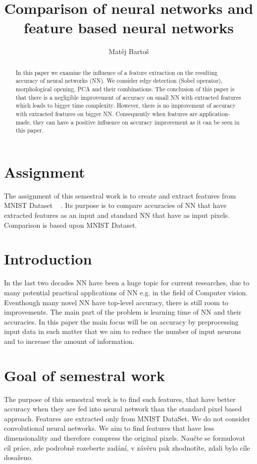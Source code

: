 \documentclass[journal]{IEEEtran}
\begin{document}
\title{Comparison of neural networks and feature based neural networks}
\author{Matěj Bartoš}

\maketitle

\begin{abstract}
In this paper we examine the influence of a feature extraction on the resulting accuracy of neural networks (NN).
We consider edge detection (Sobel operator), morphological opening, PCA and their combinations.
The conclusion of this paper is that there is a negligible improvement of accuracy on small NN with extracted features which leads to bigger time complexity. However, there is no improvement of accuracy with extracted features on bigger NN. Consequently when features are application-made, they can have a positive influence on accuracy improvement as it can be seen in this paper.
\end{abstract}

\IEEEpeerreviewmaketitle

\section{Assignment}
The assignment of this semestral work is to create and extract features from MNIST Dataset ~\cite{mnistlecun} . Its purpose is to compare accuracies of NN that have extracted features as an input and standard NN that have as input pixels. Comparison is based upon MNIST Dataset.

\section{Introduction}
In the last two decades NN have been a huge topic for current researches, due to many potential practical applications of NN e.g. in the field of Computer vision. Eventhough many novel NN have top-level accuracy, there is still room to improvements. 
The main part of the problem is learning time of NN and their accuracies. In this paper the main focus will be on accuracy by preprocessing input data in such matter that we aim to reduce the number of input neurons and to increase the amount of information.

\section{Goal of semestral work}
The purpose of this semestral work is to find such features, that have better accuracy when they are fed into neural network than the standard pixel based approach. Features are extracted only from MNIST DataSet. We do not consider convolutional neural networks. We aim to find features that have less dimensionality and therefore compress the original pixels.
Naučte se formulovat cíl práce, zde podrobně rozeberte zadání, v závěru pak zhodnotíte, zdali
bylo cíle dosaženo.
\end{document}
